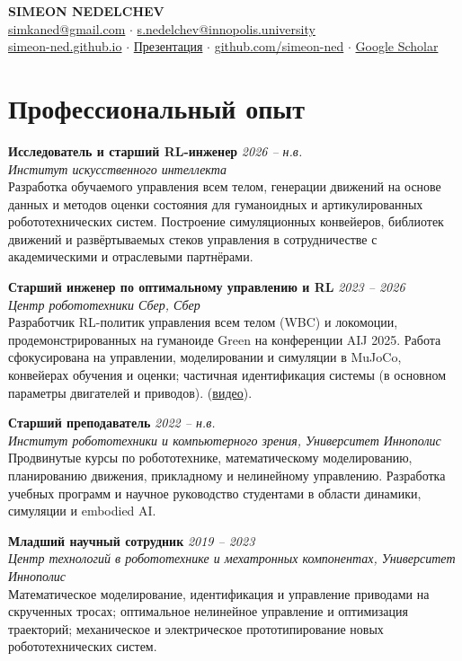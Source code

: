 \documentclass[11pt,a4paper]{article}
\newcommand{\cventry}[4]{%
  \textbf{#1} \hfill \textit{#2}\\
  \textit{#3}\\
  #4\par\vspace{0.25em}
}
\begin{document}
\begin{center}
  {\LARGE\bfseries SIMEON NEDELCHEV}\\[0.35em]
  \href{mailto:simkaned@gmail.com}{simkaned@gmail.com} \enspace$\cdot$\enspace
  \href{mailto:s.nedelchev@innopolis.university}{s.nedelchev@innopolis.university}\\[0.15em]
  \href{https://simeon-ned.github.io}{simeon-ned.github.io} \enspace$\cdot$\enspace
  \href{https://simeon-ned.github.io/presentations/template/}{Презентация} \enspace$\cdot$\enspace
  \href{https://github.com/simeon-ned}{github.com/simeon-ned} \enspace$\cdot$\enspace
  \href{https://scholar.google.com/citations?user=Jl8IxhgAAAAJ}{Google Scholar}
\end{center}

\vspace{0.4em}

\section{Профессиональный опыт}

\cventry{Исследователь и старший RL-инженер}{2026 -- н.в.}{Институт искусственного интеллекта}{%
  Разработка обучаемого управления всем телом, генерации движений на основе данных и методов оценки состояния для гуманоидных и артикулированных робототехнических систем. Построение симуляционных конвейеров, библиотек движений и развёртываемых стеков управления в сотрудничестве с академическими и отраслевыми партнёрами.}

\cventry{Старший инженер по оптимальному управлению и RL}{2023 -- 2026}{Центр робототехники Сбер, Сбер}{%
  Разработчик RL-политик управления всем телом (WBC) и локомоции, продемонстрированных на гуманоиде Green на конференции AIJ 2025. Работа сфокусирована на управлении, моделировании и симуляции в MuJoCo, конвейерах обучения и оценки; частичная идентификация системы (в основном параметры двигателей и приводов).%
  (\href{https://youtu.be/eehll8Uw3pw?t=1432}{видео}).}

\cventry{Старший преподаватель}{2022 -- н.в.}{Институт робототехники и компьютерного зрения, Университет Иннополис}{%
  Продвинутые курсы по робототехнике, математическому моделированию, планированию движения, прикладному и нелинейному управлению. Разработка учебных программ и научное руководство студентами в области динамики, симуляции и embodied AI.}

\cventry{Младший научный сотрудник}{2019 -- 2023}{Центр технологий в робототехнике и мехатронных компонентах, Университет Иннополис}{%
  Математическое моделирование, идентификация и управление приводами на скрученных тросах; оптимальное нелинейное управление и оптимизация траекторий; механическое и электрическое прототипирование новых робототехнических систем.}
\end{document}
